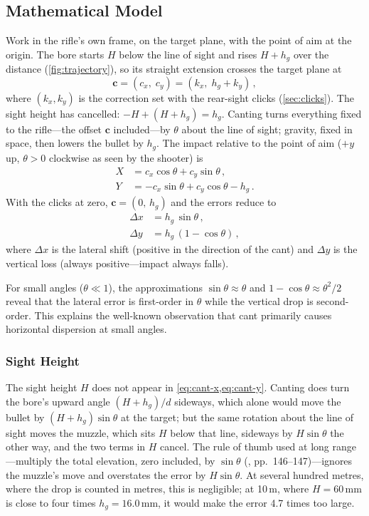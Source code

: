 \documentclass[11pt]{article}
\begin{document}
\subsection{Mathematical Model}
Work in the rifle's own frame, on the target plane, with the point of
aim at the origin.  The bore starts $H$ below the line of sight and
rises $H + h_g$ over the distance (\cref{fig:trajectory}), so its
straight extension crosses the target plane at
\begin{equation}\label{eq:cant-offset}
  \mathbf{c} = (c_x,\;c_y) = (k_x,\;h_g + k_y)\,,
\end{equation}
where $(k_x, k_y)$ is the correction set with the rear-sight clicks
(\cref{sec:clicks}).  The sight height has cancelled:
$-H + (H + h_g) = h_g$.  Canting turns everything fixed to the
rifle---the offset $\mathbf{c}$ included---by $\theta$ about the line
of sight; gravity, fixed in space, then lowers the bullet by $h_g$.
The impact relative to the point of aim ($+y$ up, $\theta > 0$
clockwise as seen by the shooter) is
\begin{align}
  X &= c_x\cos\theta + c_y\sin\theta\,,\label{eq:cant-X}\\
  Y &= -c_x\sin\theta + c_y\cos\theta - h_g\,.\label{eq:cant-Y}
\end{align}
With the clicks at zero, $\mathbf{c} = (0,\,h_g)$ and the errors
reduce to
\begin{align}
  \Delta x &= h_g\,\sin\theta \,,          \label{eq:cant-x}\\
  \Delta y &= h_g\,(1 - \cos\theta) \,,    \label{eq:cant-y}
\end{align}
where $\Delta x$ is the lateral shift (positive in the direction of
the cant) and $\Delta y$ is the vertical loss (always
positive---impact always falls).

For small angles ($\theta \ll 1$), the approximations
$\sin\theta \approx \theta$ and $1 - \cos\theta \approx
\theta^2/2$ reveal that the lateral error is first-order in $\theta$
while the vertical drop is second-order.  This explains the
well-known observation that cant primarily causes horizontal
dispersion at small angles.

\subsubsection*{Sight Height}
The sight height $H$ does not appear in \cref{eq:cant-x,eq:cant-y}.
Canting does turn the bore's upward angle $(H + h_g)/d$ sideways,
which alone would move the bullet by $(H + h_g)\sin\theta$ at the
target; but the same rotation about the line of sight moves the
muzzle, which sits $H$ below that line, sideways by $H\sin\theta$ the
other way, and the two terms in $H$ cancel.  The rule of thumb used at
long range---multiply the total elevation, zero included, by
$\sin\theta$ (\cite{litz}, pp.~146--147)---ignores the muzzle's move and
overstates the error by $H\sin\theta$.  At several hundred metres,
where the drop is counted in metres, this is negligible; at 10\,m,
where $H = 60$\,mm is close to four times $h_g = 16.0$\,mm, it would
make the error 4.7 times too large.
\end{document}
